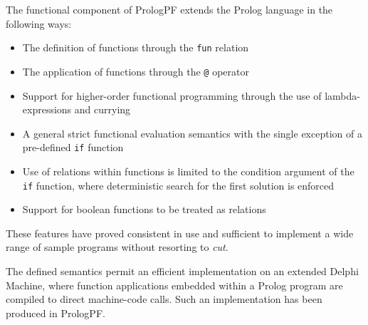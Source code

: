 The functional component of PrologPF extends
the Prolog language in the following ways:
\begin{itemize}
\item{The definition of functions through the \texttt{fun} relation}
\item{The application of functions through the \texttt{@} operator}
\item{Support for higher-order functional programming through the
  use of lambda-expressions and currying}
\item{A general strict functional evaluation semantics with
  the single exception of
  a pre-defined \texttt{if} function}
\item{Use of relations within functions is limited to the condition
  argument of the \texttt{if} function, where deterministic search for
  the first solution is enforced}
\item{Support for boolean functions to be treated as relations}
\end{itemize}

These features have proved consistent in use and sufficient to implement
a wide range of sample programs without resorting to \textit{cut}.

The defined semantics permit
an efficient implementation on an extended Delphi Machine, 
where function applications
embedded within a Prolog program are compiled to direct machine-code
calls.  Such an implementation has been produced in PrologPF.
